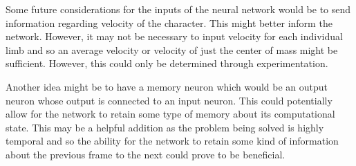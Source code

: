 \documentclass[letterpaper]{article} %
\begin{document}
Some future considerations for the inputs of the neural network would be to send information regarding velocity of the character. This might better inform the network. However, it may not be necessary to input velocity for each individual limb and so an average velocity or velocity of just the center of mass might be sufficient. However, this could only be determined through experimentation.

\par Another idea might be to have a memory neuron which would be an output neuron whose output is connected to an input neuron. This could potentially allow for the network to retain some type of memory about its computational state. This may be a helpful addition as the problem being solved is highly temporal and so the ability for the network to retain some kind of information about the previous frame to the next could prove to be beneficial.
\end{document}
